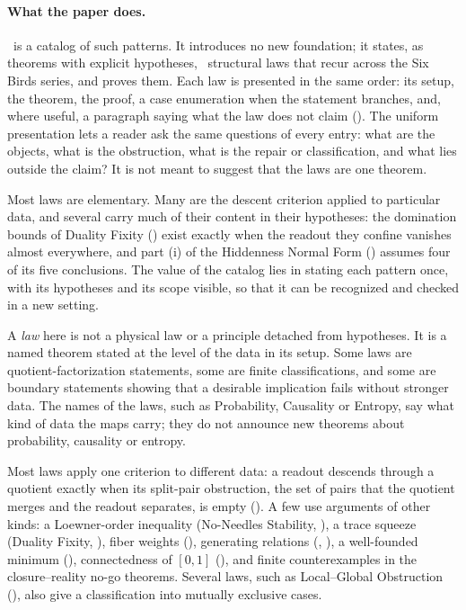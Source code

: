 \paragraph{What the paper does.}
\FIV\ is a catalog of such patterns.  It introduces no new foundation;
it states, as theorems with explicit hypotheses, \NumLaws\ structural
laws that recur across the Six Birds series, and proves them.  Each law
is presented in the same order: its setup, the theorem, the proof, a
case enumeration when the statement branches, and, where useful, a
paragraph saying what the law does not claim
().  The uniform presentation lets a reader ask
the same questions of every entry: what are the objects, what is the
obstruction, what is the repair or classification, and what lies
outside the claim?  It is not meant to suggest that the laws are one
theorem.

Most laws are elementary.  Many are the descent criterion applied to
particular data, and several carry much of their content in their
hypotheses: the domination bounds of Duality Fixity () exist
exactly when the readout they confine vanishes almost everywhere, and part (i) of the
Hiddenness Normal Form () assumes four of its five
conclusions.  The value of the catalog lies in stating each pattern
once, with its hypotheses and its scope visible, so that it can be
recognized and checked in a new setting.

A \emph{law} here is not a physical law or a principle detached from
hypotheses.  It is a named theorem stated at the level of the data in
its setup.  Some laws are quotient-factorization statements, some are
finite classifications, and some are boundary statements showing that a
desirable implication fails without stronger data.  The names of the
laws, such as Probability, Causality or Entropy, say what kind of data
the maps carry; they do not announce new theorems about probability,
causality or entropy.

Most laws apply one criterion to different data: a readout descends
through a quotient exactly when its split-pair obstruction, the set of
pairs that the quotient merges and the readout separates, is empty
().  A few use arguments of other kinds: a
Loewner-order inequality (No-Needles Stability, ), a trace
squeeze (Duality Fixity, ), fiber weights (),
generating relations (, ), a well-founded minimum
(), connectedness of \([0,1]\) (), and finite
counterexamples in the closure--reality no-go theorems.  Several laws,
such as Local--Global Obstruction (), also give a
classification into mutually exclusive cases.

